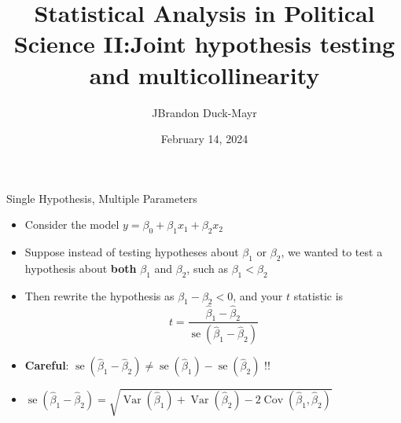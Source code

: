 \documentclass[
  ignorenonframetext,
]{beamer}
\title{Statistical Analysis in Political Science II:\newline Joint hypothesis testing and multicollinearity}
\author{JBrandon Duck-Mayr}
\date{February 14, 2024}
\providecommand{\tightlist}{%
  \setlength{\itemsep}{0pt}\setlength{\parskip}{0pt}}
\newcommand{\setsep}{\setlength{\itemsep}{3pt}}
\newcommand{\setskip}{\setlength{\parskip}{3pt}}
\renewcommand{\tightlist}{\setsep\setskip}
\begin{document}
\frame{\titlepage}

\begin{frame}{Single Hypothesis, Multiple Parameters}
\protect\hypertarget{single-hypothesis-multiple-parameters}{}
\pause

\begin{itemize}[<+->]
\tightlist
\item
  Consider the model \(y = \beta_0 + \beta_1 x_1 + \beta_2 x_2\)
\item
  Suppose instead of testing hypotheses about \(\beta_1\) or \(\beta_2\),
  we wanted to test a hypothesis about \textbf{both} \(\beta_1\) and \(\beta_2\),
  such as \(\beta_1 < \beta_2\)
\item
  Then rewrite the hypothesis as \(\beta_1 - \beta_2 < 0\), and your \(t\) statistic is \[ t = \frac{\hat{\beta}_1 - \hat{\beta}_2}{\mathop{\mathrm{se}}{\left(\hat{\beta}_1 - \hat{\beta}_2\right)}} \]
\item
  \textbf{Careful}: \(\mathop{\mathrm{se}}{\left(\hat{\beta}_1 - \hat{\beta}_2\right)} \neq \mathop{\mathrm{se}}{\left(\hat{\beta}_1\right)} - \mathop{\mathrm{se}}{\left(\hat{\beta}_2\right)}\) !!
\item
  \(\mathop{\mathrm{se}}{\left(\hat{\beta}_1 - \hat{\beta}_2\right)} = \sqrt{\mathop{\mathrm{Var}}\left(\hat{\beta}_1\right) + \mathop{\mathrm{Var}}\left(\hat{\beta}_2\right) - 2 \mathop{\mathrm{Cov}}\left(\hat{\beta}_1, \hat{\beta}_2\right)}\)
\end{itemize}
\end{frame}
\end{document}
